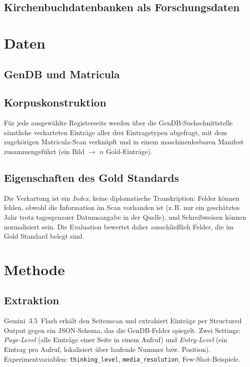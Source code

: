 \documentclass[11pt,a4paper]{article}
\begin{document}
\subsection{Kirchenbuchdatenbanken als Forschungsdaten}

\section{Daten}
\subsection{GenDB und Matricula}
\subsection{Korpuskonstruktion}
Für jede ausgewählte Registerseite werden über die GenDB-Suchschnittstelle
sämtliche verkarteten Einträge aller drei Eintragstypen abgefragt, mit dem
zugehörigen Matricula-Scan verknüpft und in einem maschinenlesbaren Manifest
zusammengeführt (ein Bild $\rightarrow$ $n$ Gold-Einträge).
\subsection{Eigenschaften des Gold Standards}
Die Verkartung ist ein \emph{Index}, keine diplomatische Transkription: Felder
können fehlen, obwohl die Information im Scan vorhanden ist (z.\,B. nur ein
geschätztes Jahr trotz tagesgenauer Datumsangabe in der Quelle), und
Schreibweisen können normalisiert sein. Die Evaluation bewertet daher
ausschließlich Felder, die im Gold Standard belegt sind.

\section{Methode}
\subsection{Extraktion}
Gemini~3.5~Flash erhält den Seitenscan und extrahiert Einträge per Structured
Output gegen ein JSON-Schema, das die GenDB-Felder spiegelt. Zwei Settings:
\emph{Page-Level} (alle Einträge einer Seite in einem Aufruf) und
\emph{Entry-Level} (ein Eintrag pro Aufruf, lokalisiert über laufende Nummer
bzw. Position). Experimentvariablen: \texttt{thinking\_level},
\texttt{media\_resolution}, Few-Shot-Beispiele.
\end{document}

